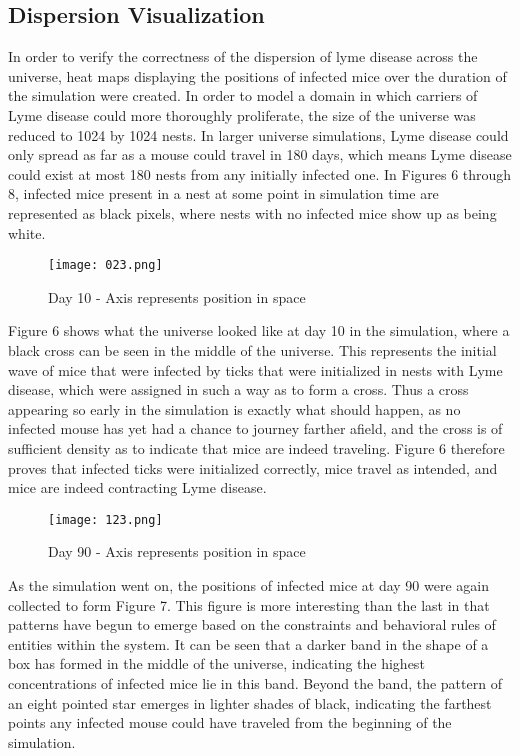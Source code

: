 \documentclass[letterpaper, 10 pt, conference]{ieeeconf}  %
\begin{document}
\subsection{Dispersion Visualization}
In order to verify the correctness of the dispersion of lyme disease across the universe, heat maps displaying the positions of infected mice over the duration of the simulation were created.  In order to model a domain in which carriers of Lyme disease could more thoroughly proliferate, the size of the universe was reduced to 1024 by 1024 nests.  In larger universe simulations, Lyme disease could only spread as far as a mouse could travel in 180 days, which means Lyme disease could exist at most 180 nests from any initially infected one.  In Figures 6 through 8, infected mice present in a nest at some point in simulation time are represented as black pixels, where nests with no infected mice show up as being white. 

\begin{figure}[!htbp]
  \texttt{[image: 023.png]}
  \caption{Day 10 - Axis represents position in space}
\end{figure}

Figure 6 shows what the universe looked like at day 10 in the simulation, where a black cross can be seen in the middle of the universe.  This represents the initial wave of mice that were infected by ticks that were initialized in nests with Lyme disease, which were assigned in such a way as to form a cross.  Thus a cross appearing so early in the simulation is exactly what should happen, as no infected mouse has yet had a chance to journey farther afield, and the cross is of sufficient density as to indicate that mice are indeed traveling.  Figure 6 therefore proves that infected ticks were initialized correctly, mice travel as intended, and mice are indeed contracting Lyme disease.

\begin{figure}[!htbp]
  \texttt{[image: 123.png]}
  \caption{Day 90 - Axis represents position in space}
\end{figure}

As the simulation went on, the positions of infected mice at day 90 were again collected to form Figure 7.  This figure is more interesting than the last in that patterns have begun to emerge based on the constraints and behavioral rules of entities within the system.  It can be seen that a darker band in the shape of a box has formed in the middle of the universe, indicating the highest concentrations of infected mice lie in this band.  Beyond the band, the pattern of an eight pointed star emerges in lighter shades of black, indicating the farthest points any infected mouse could have traveled from the beginning of the simulation.
\end{document}
